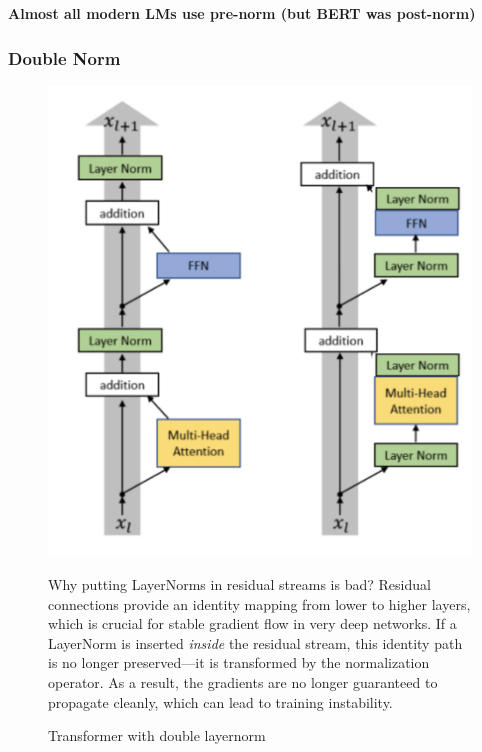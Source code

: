\textbf{Almost all modern LMs use pre-norm (but BERT was post-norm)}

\clearpage
\subsubsection{Double Norm}

\begin{figure}[htbp]
  \centering
  \begin{minipage}{0.45\linewidth}
    \includegraphics[width=\linewidth]{figs/lec3/lec3.10.png}
    \caption{Transformer with double layernorm }
  \end{minipage}
  \hfill
  \begin{minipage}{0.5\linewidth}
    \small
    \QA
    {Why putting LayerNorms in residual streams is bad?}
    {
    Residual connections provide an identity mapping from lower to higher layers, which is crucial for stable gradient flow in very deep networks.  
    If a LayerNorm is inserted \emph{inside} the residual stream, this identity path is no longer preserved---it is transformed by the normalization operator.  
    As a result, the gradients are no longer guaranteed to propagate cleanly, which can lead to training instability.  
    }
  \end{minipage}
\end{figure}

